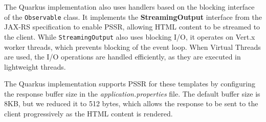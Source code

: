 The Quarkus implementation also uses handlers based on the blocking interface
of the \texttt{Observable} class. It implements the \textbf{StreamingOutput} interface
from the JAX-RS specification to enable PSSR, allowing HTML content to be
streamed to the client. While \texttt{StreamingOutput} also uses blocking I/O, it
operates on Vert.x worker threads, which prevents blocking of the event loop.
When Virtual Threads are used, the I/O operations are handled efficiently, as
they are executed in lightweight threads.

The Quarkus implementation supports PSSR for these templates by configuring the
response buffer size in the \textit{application.properties} file. The default
buffer size is 8KB, but we reduced it to 512 bytes, which allows the response
to be sent to the client progressively as the HTML content is rendered.

